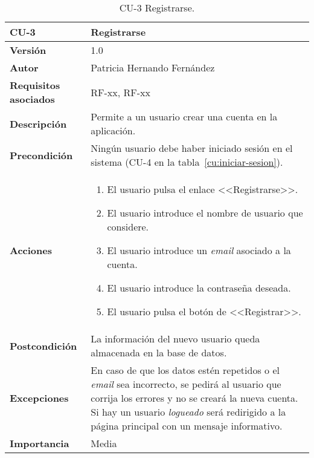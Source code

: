 \begin{table}[p]
	\centering
	\begin{tabularx}{\linewidth}{ p{} p{} }
		\toprule
		\textbf{CU-3}    & \textbf{Registrarse}\\
		\toprule
		\textbf{Versión}              & 1.0    \\
		\textbf{Autor}                & Patricia Hernando Fernández \\
		\textbf{Requisitos asociados} & RF-xx, RF-xx \\
		\textbf{Descripción}          & Permite a un usuario crear una cuenta en la aplicación.\\
		\textbf{Precondición}         & Ningún usuario debe haber iniciado sesión en el sistema (CU-4 en la tabla~\ref{cu:iniciar-sesion}). \\
		\textbf{Acciones}             &
		\begin{enumerate}
			\def\labelenumi{\arabic{enumi}.}
			\tightlist
			\item El usuario pulsa el enlace <<Registrarse>>.
			\item El usuario introduce el nombre de usuario que considere.
			\item El usuario introduce un \textit{email} asociado a la cuenta.
			\item El usuario introduce la contraseña deseada.
			\item El usuario pulsa el botón de <<Registrar>>.
		\end{enumerate}\\
		\textbf{Postcondición}        & La información del nuevo usuario queda almacenada en la base de datos. \\
		\textbf{Excepciones}          & En caso de que los datos estén repetidos o el \textit{email} sea incorrecto, se pedirá al usuario que corrija los errores y no se creará la nueva cuenta. Si hay un usuario \textit{logueado} será redirigido a la página principal con un mensaje informativo.\\
		\textbf{Importancia}          & Media \\
		\bottomrule
	\end{tabularx}
	\caption{CU-3 Registrarse.}
	\label{cu:registrarse}
\end{table}


